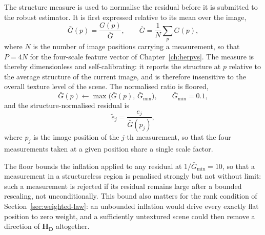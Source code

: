 The structure measure is used to normalise the residual before it is submitted
to the robust estimator. It is first expressed relative to its mean over the
image,
\begin{equation}
    \bar{G}(p)=\frac{G(p)}{\overline{G}},
    \qquad
    \overline{G}=\frac{1}{N}\sum_{p}G(p),
    \label{eq:Gbar}
\end{equation}
where $N$ is the number of image positions carrying a measurement, so that
$P=4N$ for the four-scale feature vector of Chapter~\ref{ch:herpvs}. The
measure is thereby dimensionless and self-calibrating: it reports the
structure at $p$ relative to the average structure of the current image, and
is therefore insensitive to the overall texture level of the scene. The
normalised ratio is floored,
\begin{equation}
    \bar{G}(p)\leftarrow\max\bigl(\bar{G}(p),\,\bar{G}_{\min}\bigr),
    \qquad \bar{G}_{\min}=0.1,
    \label{eq:Gfloor}
\end{equation}
and the structure-normalised residual is
\begin{equation}
    \tilde{e}_{j}=\frac{e_{j}}{\bar{G}(p_{j})},
    \label{eq:normalized-residual}
\end{equation}
where $p_{j}$ is the image position of the $j$-th measurement, so that the
four measurements taken at a given position share a single scale factor.

The floor bounds the inflation applied to any residual at
$1/\bar{G}_{\min}=10$, so that a measurement in a structureless region is
penalised strongly but not without limit: such a measurement is rejected if
its residual remains large after a bounded rescaling, not unconditionally.
This bound also matters for the rank condition of
Section~\ref{sec:weighted-law}: an unbounded inflation would drive every
exactly flat position to zero weight, and a sufficiently untextured scene
could then remove a direction of $\mathbf{H}_{\mathbf{D}}$ altogether.

